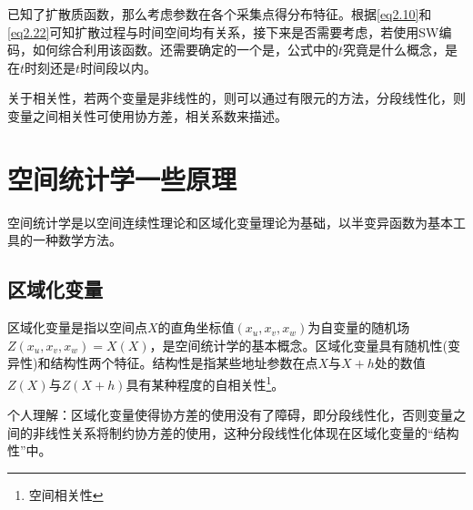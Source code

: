 \begin{note}
    已知了扩散质函数，那么考虑参数在各个采集点得分布特征。根据\cref{eq2.10}和\cref{eq2.22}可知扩散过程与时间空间均有关系，接下来是否需要考虑，若使用SW编码，如何综合利用该函数。还需要确定的一个是，公式中的$t$究竟是什么概念，是在$t$时刻还是$t$时间段以内。

    关于相关性，若两个变量是非线性的，则可以通过有限元的方法，分段线性化，则变量之间相关性可使用协方差，相关系数来描述。
\end{note}


\section{空间统计学一些原理}
空间统计学是以空间连续性理论和区域化变量理论为基础，以半变异函数为基本工具的一种数学方法。


\subsection{区域化变量}
区域化变量是指以空间点$X$的直角坐标值$(x_u,x_v,x_w)$为自变量的随机场$Z(x_u,x_v,x_w) = X(X)$，是空间统计学的基本概念。区域化变量具有随机性(变异性)和结构性两个特征。结构性是指某些地址参数在点$X$与$X+h$处的数值$Z(X)$与$Z(X+h)$具有某种程度的自相关性\footnote{空间相关性}。
\begin{note}
    个人理解：区域化变量使得协方差的使用没有了障碍，即分段线性化，否则变量之间的非线性关系将制约协方差的使用，这种分段线性化体现在区域化变量的``结构性''中。
\end{note}




